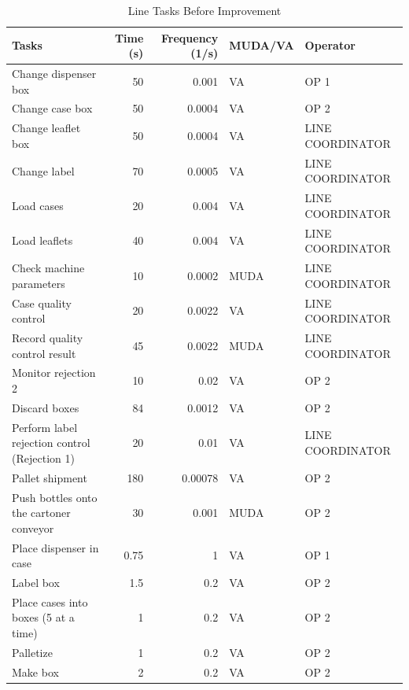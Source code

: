 
\begin{table}[ht]
\centering
\scriptsize %
\begin{tabular}{p{3.5cm} r r p{1.5cm} p{2.5cm}}
\hline
Tasks & Time (s) & Frequency (1/s) & MUDA/VA & Operator \\
\hline
Change dispenser box & 50 & 0.001 & VA & OP 1 \\
Change case box & 50 & 0.0004 & VA & OP 2 \\
Change leaflet box & 50 & 0.0004 & VA & LINE COORDINATOR \\
Change label & 70 & 0.0005 & VA & LINE COORDINATOR \\
Load cases & 20 & 0.004 & VA & LINE COORDINATOR \\
Load leaflets & 40 & 0.004 & VA & LINE COORDINATOR \\
Check machine parameters & 10 & 0.0002 & MUDA & LINE COORDINATOR \\
Case quality control & 20 & 0.0022 & VA & LINE COORDINATOR \\
Record quality control result & 45 & 0.0022 & MUDA & LINE COORDINATOR \\
Monitor rejection 2 & 10 & 0.02 & VA & OP 2 \\
Discard boxes & 84 & 0.0012 & VA & OP 2 \\
Perform label rejection control (Rejection 1) & 20 & 0.01 & VA & LINE COORDINATOR \\
Pallet shipment & 180 & 0.00078 & VA & OP 2 \\
Push bottles onto the cartoner conveyor & 30 & 0.001 & MUDA & OP 2 \\
Place dispenser in case & 0.75 & 1 & VA & OP 1 \\
Label box & 1.5 & 0.2 & VA & OP 2 \\
Place cases into boxes (5 at a time) & 1 & 0.2 & VA & OP 2 \\
Palletize & 1 & 0.2 & VA & OP 2 \\
Make box & 2 & 0.2 & VA & OP 2 \\
\hline
\end{tabular}
\caption{Line Tasks Before Improvement}
\label{tab:line_tasks_before}
\end{table}

